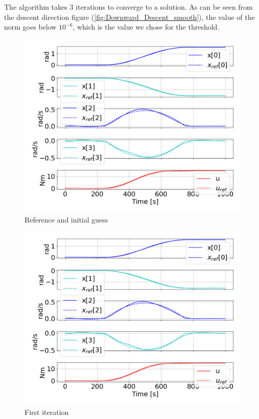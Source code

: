 The algorithm takes 3 iterations to converge to a solution. As can be seen from the descent direction figure (\ref{fig:Downward_Descent_smooth}), the value of the norm goes below $10^{-6}$, which is the value we chose for the threshold.

\begin{figure}
    \centering
    \includegraphics[width=0.8\linewidth]{figs/downward_0_smooth.png}
    \caption{Reference and initial guess}
    \label{fig:downward_0_smooth}
\end{figure}

\begin{figure}
    \centering
    \includegraphics[width=0.8\linewidth]{figs/downward_1_smooth.png}
    \caption{First iteration}
    \label{fig:downward_1_smooth}
\end{figure}

